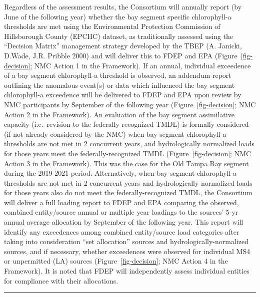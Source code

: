 \documentclass[
  letterpaper,
  DIV=11,
  numbers=noendperiod]{scrreprt}
\begin{document}
Regardless of the assessment results, the Consortium will annually
report (by June of the following year) whether the bay segment specific
chlorophyll-a thresholds are met using the Environmental Protection
Commission of Hillsborough County (EPCHC) dataset, as traditionally
assessed using the ``Decision Matrix'' management strategy developed by
the TBEP (A. Janicki, D.Wade, J.R. Pribble 2000) and will deliver this
to FDEP and EPA (Figure~\ref{fig-decision}; NMC Action 1 in the
Framework). If an annual, individual exceedence of a bay segment
chlorophyll-a threshold is observed, an addendum report outlining the
anomalous event(s) or data which influenced the bay segment
chlorophyll-a exceedence will be delivered to FDEP and EPA upon review
by NMC participants by September of the following year
(Figure~\ref{fig-decision}; NMC Action 2 in the Framework). An
evaluation of the bay segment assimilative capacity (i.e.~revision to
the federally-recognized TMDL) is formally considered (if not already
considered by the NMC) when bay segment chlorophyll-a thresholds are not
met in 2 concurrent years, and hydrologically normalized loads for those
years meet the federally-recognized TMDL (Figure~\ref{fig-decision}; NMC
Action 3 in the Framework). This was the case for the Old Tampa Bay
segment during the 2019-2021 period. Alternatively, when bay segment
chlorophyll-a thresholds are not met in 2 concurrent years and
hydrologically normalized loads for those years also do not meet the
federally-recognized TMDL, the Consortium will deliver a full loading
report to FDEP and EPA comparing the observed, combined entity/source
annual or multiple year loadings to the sources' 5-yr annual average
allocation by September of the following year. This report will identify
any exceedences among combined entity/source load categories after
taking into consideration ``set allocation'' sources and
hydrologically-normalized sources, and if necessary, whether exceedences
were observed for individual MS4 or unpermitted (LA) sources
(Figure~\ref{fig-decision}; NMC Action 4 in the Framework). It is noted
that FDEP will independently assess individual entities for compliance
with their allocations.

\begin{center}\rule{0.5\linewidth}{0.5pt}\end{center}
\end{document}
